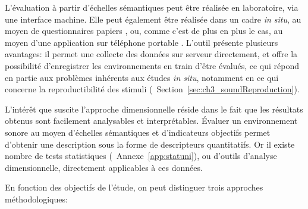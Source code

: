 L'évaluation à partir d'échelles sémantiques peut être réalisée en laboratoire, via une interface machine. Elle peut également être réalisée dans un cadre \emph{in situ}, au moyen de questionnaires papiers \citep{jeon2013soundwalk,torija2013application}, ou, comme c'est de plus en plus le cas, au moyen d'une application sur téléphone portable \citep{ricciardi2015sound}. L'outil présente plusieurs avantages: il permet une collecte des données sur serveur directement, et offre la possibilité d'enregistrer les environnements en train d'être évalués, ce qui répond en partie aux problèmes inhérents aux études \emph{in situ}, notamment en ce qui concerne la reproductibilité des stimuli (\cf~Section~\ref{sec:ch3_soundReproduction}).

L'intérêt que suscite l'approche dimensionnelle réside dans le fait que les résultats obtenus sont facilement analysables et interprétables. Évaluer un environnement sonore au moyen d'échelles sémantiques et d'indicateurs objectifs permet d'obtenir une description sous la forme de descripteurs quantitatifs. Or il existe nombre de tests statistiques (\cf~Annexe~\ref{app:statuni}), ou d'outils d'analyse dimensionnelle, directement applicables à ces données.

En fonction des objectifs de l'étude, on peut distinguer trois approches méthodologiques:

